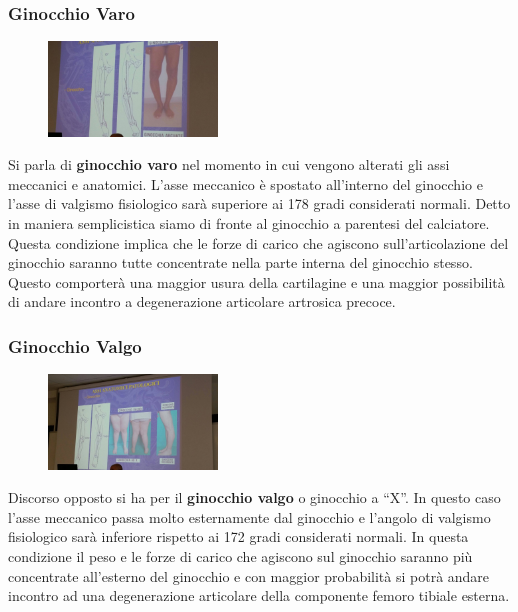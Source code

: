 \subsubsection{Ginocchio Varo}

\begin{figure}[!ht]
\centering
\includegraphics[width=0.4\textwidth]{008/image3.jpeg}
\end{figure}

Si parla di \textbf{ginocchio varo} nel momento in cui vengono alterati gli assi meccanici e anatomici. L'asse meccanico è spostato all'interno del ginocchio e l'asse di valgismo fisiologico sarà superiore ai 178 gradi considerati normali. Detto in maniera semplicistica siamo di fronte al ginocchio a parentesi del calciatore. Questa condizione implica che le forze di carico che agiscono sull'articolazione del ginocchio saranno tutte concentrate nella parte interna del ginocchio stesso. Questo comporterà una maggior usura della cartilagine e una maggior possibilità di andare incontro a degenerazione articolare artrosica precoce.

\subsubsection{Ginocchio Valgo}

\begin{figure}[!ht]
\centering
\includegraphics[width=0.4\textwidth]{008/image4.jpeg}
\end{figure}

Discorso opposto si ha per il \textbf{ginocchio valgo} o ginocchio a ``X''. In questo caso l'asse meccanico passa molto esternamente dal ginocchio e l'angolo di valgismo fisiologico sarà inferiore rispetto ai 172 gradi considerati normali. In questa condizione il peso e le forze di carico che agiscono sul ginocchio saranno più concentrate all'esterno del ginocchio e con maggior probabilità si potrà andare incontro ad una degenerazione articolare della componente femoro tibiale esterna.

